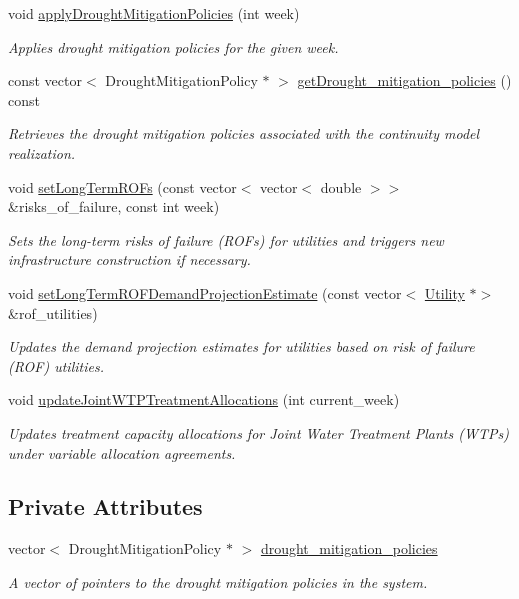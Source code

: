 \begin{DoxyCompactItemize}
void \mbox{\hyperlink{classContinuityModelRealization_a1841f4ca49c150cf5d790f6d42496575}{apply\+Drought\+Mitigation\+Policies}} (int week)
\begin{DoxyCompactList}\small\item\em Applies drought mitigation policies for the given week. \end{DoxyCompactList}\item 
const vector$<$ Drought\+Mitigation\+Policy $\ast$ $>$ \mbox{\hyperlink{classContinuityModelRealization_afadb3e7f51ae7a09948ffc73d7eb7f6b}{get\+Drought\+\_\+mitigation\+\_\+policies}} () const
\begin{DoxyCompactList}\small\item\em Retrieves the drought mitigation policies associated with the continuity model realization. \end{DoxyCompactList}\item 
void \mbox{\hyperlink{classContinuityModelRealization_aa0168985144d26e1613cf20335affedb}{set\+Long\+Term\+R\+O\+Fs}} (const vector$<$ vector$<$ double $>$$>$ \&risks\+\_\+of\+\_\+failure, const int week)
\begin{DoxyCompactList}\small\item\em Sets the long-\/term risks of failure (R\+O\+Fs) for utilities and triggers new infrastructure construction if necessary. \end{DoxyCompactList}\item 
void \mbox{\hyperlink{classContinuityModelRealization_a5b9405156e8cc21c8781ea15ee46c8fe}{set\+Long\+Term\+R\+O\+F\+Demand\+Projection\+Estimate}} (const vector$<$ \mbox{\hyperlink{classUtility}{Utility}} $\ast$$>$ \&rof\+\_\+utilities)
\begin{DoxyCompactList}\small\item\em Updates the demand projection estimates for utilities based on risk of failure (R\+OF) utilities. \end{DoxyCompactList}\item 
void \mbox{\hyperlink{classContinuityModelRealization_ab87c140eaf87266ca81636059e948bb7}{update\+Joint\+W\+T\+P\+Treatment\+Allocations}} (int current\+\_\+week)
\begin{DoxyCompactList}\small\item\em Updates treatment capacity allocations for Joint Water Treatment Plants (W\+T\+Ps) under variable allocation agreements. \end{DoxyCompactList}\end{DoxyCompactItemize}
\subsection*{Private Attributes}
\begin{DoxyCompactItemize}
\item 
vector$<$ Drought\+Mitigation\+Policy $\ast$ $>$ \mbox{\hyperlink{classContinuityModelRealization_a757dcf1de115c674fd5adcb040c5f277}{drought\+\_\+mitigation\+\_\+policies}}
\begin{DoxyCompactList}\small\item\em A vector of pointers to the drought mitigation policies in the system. \end{DoxyCompactList}\end{DoxyCompactItemize}
